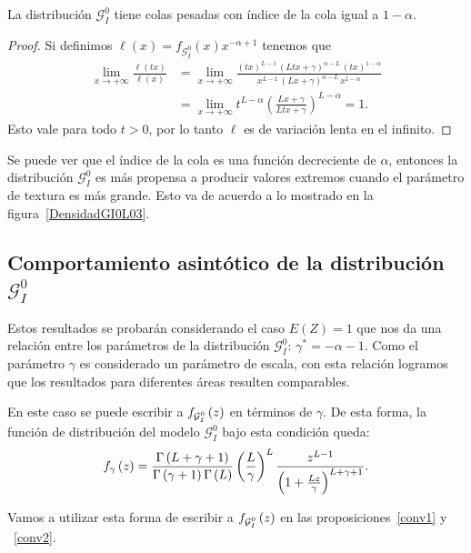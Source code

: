 \begin{proposition}
	La distribución $\mathcal G_{I}^0$ tiene colas pesadas con índice de la cola igual a $1-\alpha$.
\end{proposition}
\begin{proof}
	Si definimos $\ell(x)=f_{\mathcal G_I^0}(x) x^{-\alpha+1}$ tenemos que
	\begin{align*}
	\lim_{x\to+\infty}\frac{\ell(t x)}{\ell(x)}&=\lim_{x\to+\infty}\frac{(tx)^{L-1} \, (Ltx+\gamma)^{\alpha-L} \, (tx)^{1-\alpha}}{x^{L-1} \, (Lx+\gamma)^{\alpha-L} \, x^{1-\alpha}}\\
	&=\lim_{x\to+\infty}t^{L-\alpha}\left(\frac{Lx+\gamma}{L tx+\gamma}\right)^{L-\alpha}=1.
	\end{align*}
	Esto vale para todo $t>0$, por lo tanto $\ell$ es de variación lenta en el infinito.
\end{proof}
Se puede ver que el índice de la cola es una función decreciente de $\alpha$, entonces la distribución $\mathcal G_I^0$ es más propensa a producir valores extremos cuando el parámetro de textura es más grande. Esto va de acuerdo a lo mostrado en la figura~\ref{DensidadGI0L03}.

\subsection{Comportamiento asintótico de la distribución $\mathcal{G}_I^0$}
Estos resultados se probarán considerando el caso $E(Z)=1$ que nos da una relación entre los parámetros de la distribución $\mathcal{G}_I^0$: $\gamma^*=-\alpha-1$. Como el parámetro $\gamma$ es considerado un parámetro de escala, con esta relación logramos que los resultados para diferentes áreas resulten comparables.
 
En este caso se puede escribir a $f_{\mathcal{G}_I^0}\left( z \right)$ en términos de $\gamma$. De esta forma, la función de distribución del modelo $\mathcal{G}_I^0$ bajo esta condición queda:
\begin{align}
\label{fenfunciondegamma}
f_{\gamma}\left( z \right)=\frac{\Gamma\left( L+\gamma+1 \right)}{\Gamma\left( \gamma+1 \right)\Gamma\left( L \right)}
\left( \frac{L}{\gamma} \right)^L \frac{z^{L-1}}{\left( 1+\frac{Lz}{\gamma} \right)^{L+\gamma+1}}.
\end{align}

Vamos a utilizar esta forma de escribir a $f_{\mathcal{G}_I^0}\left( z \right)$ en las proposiciones~\ref{conv1} y ~\ref{conv2}.

